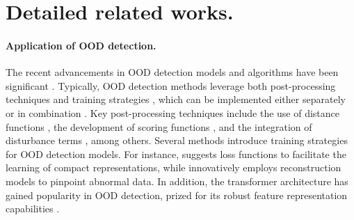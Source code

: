 \documentclass{article}
\theoremstyle{plain}
\theoremstyle{definition}
\theoremstyle{remark}
\begin{document}







\newpage
\appendix
\onecolumn
\section{Detailed related works. }\label{Related works}
\paragraph{Application of OOD detection. }
The recent advancements in OOD detection models and algorithms have been significant \citep{sun2022out, liu2023good, cai2023out}. Typically, OOD detection methods leverage both post-processing techniques \citep{regmi2025adascaleadaptivescalingood} and training strategies \citep{tao2023non}, which can be implemented either separately or in combination \citep{zhang2023openood}. Key post-processing techniques include the use of distance functions \citep{denouden2018improving}, the development of scoring functions \citep{ming2022delving}, and the integration of disturbance terms \citep{hsu2020generalized}, among others.
%
Several methods introduce training strategies for OOD detection models. For instance, \citet{tao2023non} suggests loss functions to facilitate the learning of compact representations, while \citet{graham2023denoising, jiang2023read} innovatively employs reconstruction models to pinpoint abnormal data. In addition, the transformer architecture has gained popularity in OOD detection, prized for its robust feature representation capabilities \citep{koner2021oodformer, fort2021exploring, liu2025detecting}.
\end{document}
